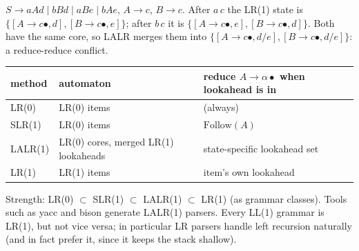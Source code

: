 \begin{example}
$S \to a A d \mid b B d \mid a B e \mid b A e$, $A \to c$, $B\to c$. After $a\,c$ the LR(1)
state is $\{[A\to c\bullet, d], [B\to c\bullet, e]\}$; after $b\,c$ it is
$\{[A\to c\bullet, e], [B\to c\bullet, d]\}$. Both have the same core, so LALR merges them into
$\{[A\to c\bullet, d/e], [B\to c\bullet, d/e]\}$: a reduce-reduce conflict.
\end{example}
\begin{center}
\end{center}

\begin{center}
\begin{tabular}{lll}
\toprule
method & automaton & reduce $A\to\alpha\bullet$ when lookahead is in \\
\midrule
LR(0) & LR(0) items & (always) \\
SLR(1) & LR(0) items & $\mathrm{Follow}(A)$ \\
LALR(1) & LR(0) cores, merged LR(1) lookaheads & state-specific lookahead set \\
LR(1) & LR(1) items & item's own lookahead \\
\bottomrule
\end{tabular}
\end{center}
Strength: LR(0) $\subset$ SLR(1) $\subset$ LALR(1) $\subset$ LR(1) (as grammar classes).
Tools such as yacc and bison generate LALR(1) parsers. Every LL(1) grammar is LR(1), but
not vice versa; in particular LR parsers handle left recursion naturally (and in fact
prefer it, since it keeps the stack shallow).

